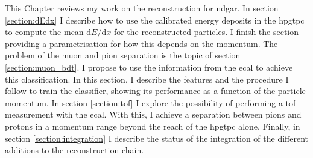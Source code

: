 This Chapter reviews my work on the reconstruction for \gls{ndgar}. In section \ref{section:dEdx} I describe how to use the calibrated energy deposits in the \gls{hpgtpc} to compute the mean $\mathrm{d}E/\mathrm{d}x$ for the reconstructed particles. I finish the section providing a parametrisation for how this depends on the momentum. The problem of the muon and pion separation is the topic of section \ref{section:muon_bdt}. I propose to use the information from the \gls{ecal} to achieve this classification. In this section, I describe the features and the procedure I follow to train the classifier, showing its performance as a function of the particle momentum. In section \ref{section:tof} I explore the possibility of performing a \gls{tof} measurement with the \gls{ecal}. With this, I achieve a separation between pions and protons in a momentum range beyond the reach of the \gls{hpgtpc} alone. Finally, in section \ref{section:integration} I describe the status of the integration of the different additions to the reconstruction chain.